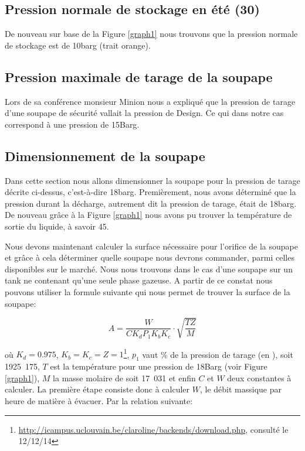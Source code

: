 \subsection{Pression normale de stockage en été (\unit{30}{\celsius})}

De nouveau sur base de la Figure \ref{graph1} nous trouvons que la pression normale de stockage est de \unit{10}{barg} (trait orange).

\subsection{Pression maximale de tarage de la soupape}

Lors de sa conférence monsieur Minion nous a expliqué que la pression de tarage d'une soupape de sécurité vallait la pression de Design. Ce qui dans notre cas correspond à une pression de \unit{15}{Barg}.

\subsection{Dimensionnement de la soupape}

Dans cette section nous allons dimensionner la soupape pour la pression de tarage décrite ci-dessus, c'est-à-dire \unit{18}{barg}.
Premièrement, nous avons déterminé que la pression durant la décharge, autrement dit la pression de tarage, était de \unit{18}{barg}. De nouveau grâce à la Figure \ref{graph1} nous avons pu trouver la température de sortie du liquide, à savoir \unit{45}{\celsius}.

Nous devons maintenant calculer la surface nécessaire pour l'orifice de la soupape et grâce à cela déterminer quelle soupape nous devrons commander, parmi celles disponibles sur le marché. Nous nous trouvons dans le cas d'une soupape sur un tank ne contenant qu'une seule phase gazeuse. A partir de ce constat nous pouvons utiliser la formule suivante qui nous permet de trouver la surface de la soupape:

\begin{equation}
A=\dfrac{W}{CK_dP_1K_bK_c}\cdot \sqrt{\dfrac{TZ}{M}}
\label{1}
\end{equation}

où $K_d=0.975$, $K_b=K_c=Z=1$\footnote{\small \url{http://icampus.uclouvain.be/claroline/backends/download.php}, consulté le 12/12/14}, $p_1$ vaut  \% de la pression de tarage (en \bbar), soit \unit{1925.175}{\kilo \pascal}, $T$ est la température pour une pression de \unit{18}{Barg} (voir Figure \ref{graph1}), $M$ la masse molaire de  soit \unit{17.031}{\gram \per \mole} et enfin $C$ et $W$ deux constantes à calculer. La première étape consiste donc à calculer $W$, le débit massique par heure de matière à évacuer. Par la relation suivante:


